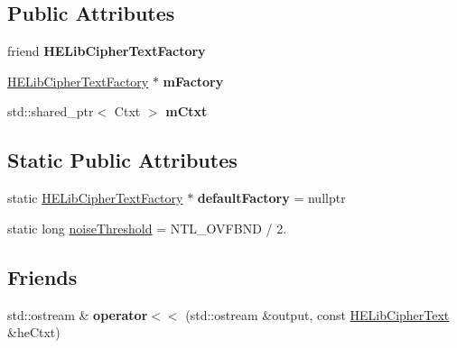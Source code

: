 \subsection*{Public Attributes}
\begin{DoxyCompactItemize}
\item 
\mbox{\label{classHELibCipherText_a381d85c9c460b5003e2f81f2f7e9480b}} 
friend {\bfseries H\+E\+Lib\+Cipher\+Text\+Factory}
\item 
\mbox{\label{classHELibCipherText_abf2e204089bb5428c5710468f3c1025b}} 
\hyperlink{classHELibCipherTextFactory}{H\+E\+Lib\+Cipher\+Text\+Factory} $\ast$ {\bfseries m\+Factory}
\item 
\mbox{\label{classHELibCipherText_ac3bb6aa6de466df9bc2bf428dfb8d17d}} 
std\+::shared\+\_\+ptr$<$ Ctxt $>$ {\bfseries m\+Ctxt}
\end{DoxyCompactItemize}
\subsection*{Static Public Attributes}
\begin{DoxyCompactItemize}
\item 
\mbox{\label{classHELibCipherText_aa69789ae95ec28a396e6b814841b6b96}} 
static \hyperlink{classHELibCipherTextFactory}{H\+E\+Lib\+Cipher\+Text\+Factory} $\ast$ {\bfseries default\+Factory} = nullptr
\item 
static long \hyperlink{classHELibCipherText_a50b612eb9ab3d247d608ee1334af0e27}{noise\+Threshold} = N\+T\+L\+\_\+\+O\+V\+F\+B\+ND / 2.
\end{DoxyCompactItemize}
\subsection*{Friends}
\begin{DoxyCompactItemize}
\item 
\mbox{\label{classHELibCipherText_ac4a4a31618a35edab4474b9a1a72314e}} 
std\+::ostream \& {\bfseries operator$<$$<$} (std\+::ostream \&output, const \hyperlink{classHELibCipherText}{H\+E\+Lib\+Cipher\+Text} \&he\+Ctxt)
\end{DoxyCompactItemize}



